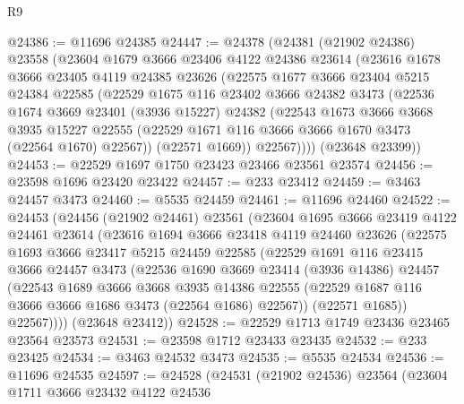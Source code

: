 \begin{lexlean}{R9}
\begin{coremodule}
@24386 := @11696 @24385
@24447 := @24378
    (@24381
      (@21902 @24386)
      @23558
      (@23604
        @1679
        @3666
        @23406
        @4122
        @24386
        @23614
        (@23616
          @1678
          @3666
          @23405
          @4119
          @24385
          @23626
          (@22575
            @1677
            @3666
            @23404
            @5215
            @24384
            @22585
            (@22529
              @1675
              @116
              @23402
              @3666
              @24382
              @3473
              (@22536
                @1674
                @3669
                @23401
                (@3936 @15227)
                @24382
                (@22543
                  @1673
                  @3666
                  @3668
                  @3935
                  @15227
                  @22555
                  (@22529 @1671 @116 @3666 @3666 @1670 @3473 (@22564 @1670) @22567))
                (@22571 @1669))
              @22567))))
      (@23648 @23399))
@24453 := @22529 @1697 @1750 @23423 @23466 @23561 @23574
@24456 := @23598 @1696 @23420 @23422
@24457 := @233 @23412
@24459 := @3463 @24457 @3473
@24460 := @5535 @24459
@24461 := @11696 @24460
@24522 := @24453
    (@24456
      (@21902 @24461)
      @23561
      (@23604
        @1695
        @3666
        @23419
        @4122
        @24461
        @23614
        (@23616
          @1694
          @3666
          @23418
          @4119
          @24460
          @23626
          (@22575
            @1693
            @3666
            @23417
            @5215
            @24459
            @22585
            (@22529
              @1691
              @116
              @23415
              @3666
              @24457
              @3473
              (@22536
                @1690
                @3669
                @23414
                (@3936 @14386)
                @24457
                (@22543
                  @1689
                  @3666
                  @3668
                  @3935
                  @14386
                  @22555
                  (@22529 @1687 @116 @3666 @3666 @1686 @3473 (@22564 @1686) @22567))
                (@22571 @1685))
              @22567))))
      (@23648 @23412))
@24528 := @22529 @1713 @1749 @23436 @23465 @23564 @23573
@24531 := @23598 @1712 @23433 @23435
@24532 := @233 @23425
@24534 := @3463 @24532 @3473
@24535 := @5535 @24534
@24536 := @11696 @24535
@24597 := @24528
    (@24531
      (@21902 @24536)
      @23564
      (@23604
        @1711
        @3666
        @23432
        @4122
        @24536

\end{coremodule}
\end{lexlean}
